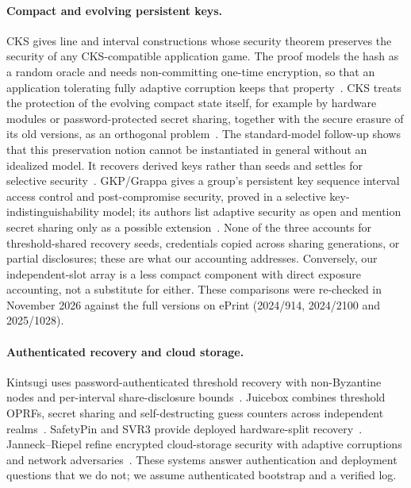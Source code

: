 \documentclass[pdflatex,sn-mathphys-num]{sn-jnl}%
\theoremstyle{plain}
\theoremstyle{definition}
\begin{document}
\paragraph{Compact and evolving persistent keys.}
CKS gives line and interval constructions whose security theorem preserves the security of any CKS-compatible application game. The proof models the hash as a random oracle and needs non-committing one-time encryption, so that an application tolerating fully adaptive corruption keeps that property~\cite[Thm.~3]{dodis2024}. CKS treats the protection of the evolving compact state itself, for example by hardware modules or password-protected secret sharing, together with the secure erasure of its old versions, as an orthogonal problem~\cite[Sect.~1]{dodis2024}. The standard-model follow-up shows that this preservation notion cannot be instantiated in general without an idealized model. It recovers derived keys rather than seeds and settles for selective security~\cite[Sects.~1.1 and~2.3]{dodisstandard2024}. GKP/Grappa gives a group's persistent key sequence interval access control and post-compromise security, proved in a selective key-indistinguishability model; its authors list adaptive security as open and mention secret sharing only as a possible extension~\cite[Sects.~1 and~7.1]{backendal2026}. None of the three accounts for threshold-shared recovery seeds, credentials copied across sharing generations, or partial disclosures; these are what our accounting addresses. Conversely, our independent-slot array is a less compact component with direct exposure accounting, not a substitute for either. These comparisons were re-checked in November 2026 against the full versions on ePrint (2024/914, 2024/2100 and 2025/1028).

\paragraph{Authenticated recovery and cloud storage.}
Kintsugi uses password-authenticated threshold recovery with non-Byzantine nodes and per-interval share-disclosure bounds~\cite{ma2025}. Juicebox combines threshold OPRFs, secret sharing and self-destructing guess counters across independent realms~\cite{trapp2025}. SafetyPin and SVR3 provide deployed hardware-split recovery~\cite{dauterman2020,connell2024}. Janneck--Riepel refine encrypted cloud-storage security with adaptive corruptions and network adversaries~\cite{janneck2026}. These systems answer authentication and deployment questions that we do not; we assume authenticated bootstrap and a verified log.
\end{document}
